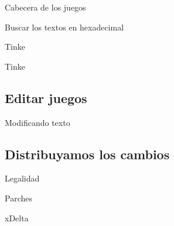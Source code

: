 \begin{frame}{Cabecera de los juegos}
\end{frame}

\begin{frame}{Buscar los textos en hexadecimal}
\end{frame}

\begin{frame}{Tinke}
\end{frame}

\begin{frame}{Tinke}
\end{frame}

\subsection{Editar juegos}
\begin{frame}{Modificando texto}
\end{frame}

\subsection{Distribuyamos los cambios}
\begin{frame}{Legalidad}
\end{frame}

\begin{frame}{Parches}
\end{frame}

\begin{frame}{xDelta}
\end{frame}
